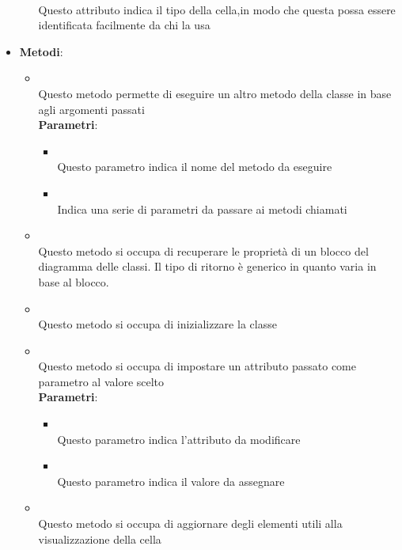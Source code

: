 \begin{itemize}
\begin{itemize}
\\ Questo attributo indica il tipo della cella,in modo che questa possa essere identificata facilmente da chi la usa
\end{itemize}
\item \textbf{Metodi}:
\begin{itemize}
\item {}
\\ Questo metodo permette di eseguire un altro metodo della classe in base agli argomenti passati
\\ \textbf{Parametri}:
\begin{itemize}
\item {}
\\ Questo parametro indica il nome del metodo da eseguire
\item {}
\\ Indica una serie di parametri da passare ai metodi chiamati
\end{itemize}
\item {}
\\ Questo metodo si occupa di recuperare le proprietà di un blocco del diagramma delle classi. Il tipo di ritorno è generico in quanto varia in base al blocco.
\item {}
\\ Questo metodo si occupa di inizializzare la classe
\item {}
\\ Questo metodo si occupa di impostare un attributo passato come parametro al valore scelto
\\ \textbf{Parametri}:
\begin{itemize}
\item {}
\\ Questo parametro indica l'attributo da modificare
\item {}
\\ Questo parametro indica il valore da assegnare
\end{itemize}
\item {}
\\ Questo metodo si occupa di aggiornare degli elementi utili alla visualizzazione della cella
\end{itemize}
\end{itemize}

